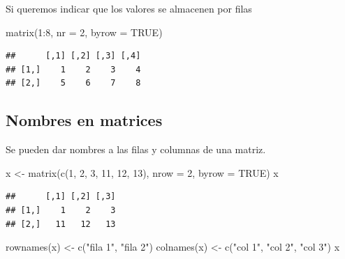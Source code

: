 \documentclass[
]{book}
\newenvironment{Shaded}{\begin{snugshade}}{\end{snugshade}}
\newcommand{\AttributeTok}[1]{\textcolor[rgb]{0.77,0.63,0.00}{#1}}
\newcommand{\ConstantTok}[1]{\textcolor[rgb]{0.00,0.00,0.00}{#1}}
\newcommand{\DecValTok}[1]{\textcolor[rgb]{0.00,0.00,0.81}{#1}}
\newcommand{\FunctionTok}[1]{\textcolor[rgb]{0.00,0.00,0.00}{#1}}
\newcommand{\NormalTok}[1]{#1}
\newcommand{\OtherTok}[1]{\textcolor[rgb]{0.56,0.35,0.01}{#1}}
\newcommand{\SpecialCharTok}[1]{\textcolor[rgb]{0.00,0.00,0.00}{#1}}
\newcommand{\StringTok}[1]{\textcolor[rgb]{0.31,0.60,0.02}{#1}}
\theoremstyle{break}
\theoremstyle{nonumberplain}
\begin{document}
Si queremos indicar que los valores se almacenen por filas

\begin{Shaded}
\begin{Highlighting}[]
\FunctionTok{matrix}\NormalTok{(}\DecValTok{1}\SpecialCharTok{:}\DecValTok{8}\NormalTok{, }\AttributeTok{nr =} \DecValTok{2}\NormalTok{, }\AttributeTok{byrow =} \ConstantTok{TRUE}\NormalTok{)}
\end{Highlighting}
\end{Shaded}

\begin{verbatim}
##      [,1] [,2] [,3] [,4]
## [1,]    1    2    3    4
## [2,]    5    6    7    8
\end{verbatim}

\hypertarget{nombres-en-matrices}{%
\subsection{Nombres en matrices}\label{nombres-en-matrices}}

Se pueden dar nombres a las filas y columnas de una matriz.

\begin{Shaded}
\begin{Highlighting}[]
\NormalTok{x }\OtherTok{\textless{}{-}} \FunctionTok{matrix}\NormalTok{(}\FunctionTok{c}\NormalTok{(}\DecValTok{1}\NormalTok{, }\DecValTok{2}\NormalTok{, }\DecValTok{3}\NormalTok{, }\DecValTok{11}\NormalTok{, }\DecValTok{12}\NormalTok{, }\DecValTok{13}\NormalTok{), }\AttributeTok{nrow =} \DecValTok{2}\NormalTok{, }\AttributeTok{byrow =} \ConstantTok{TRUE}\NormalTok{)}
\NormalTok{x}
\end{Highlighting}
\end{Shaded}

\begin{verbatim}
##      [,1] [,2] [,3]
## [1,]    1    2    3
## [2,]   11   12   13
\end{verbatim}

\begin{Shaded}
\begin{Highlighting}[]
\FunctionTok{rownames}\NormalTok{(x) }\OtherTok{\textless{}{-}} \FunctionTok{c}\NormalTok{(}\StringTok{"fila 1"}\NormalTok{, }\StringTok{"fila 2"}\NormalTok{)}
\FunctionTok{colnames}\NormalTok{(x) }\OtherTok{\textless{}{-}} \FunctionTok{c}\NormalTok{(}\StringTok{"col 1"}\NormalTok{, }\StringTok{"col 2"}\NormalTok{, }\StringTok{"col 3"}\NormalTok{)}
\NormalTok{x }
\end{Highlighting}
\end{Shaded}
\end{document}
